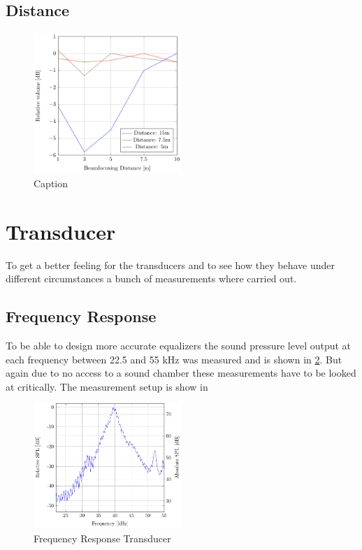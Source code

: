 \subsection{Distance}
\begin{figure}
    \centering
    \includegraphics[width=0.5\textwidth]{images/6_Measurements/Beamfocusing.pdf}
    \caption{Caption}
    \label{fig:my_label}
\end{figure}
\section{Transducer}
To get a better feeling for the transducers and to see how they behave under different circumstances a bunch of measurements where carried out. 
\subsection{Frequency Response}\label{6_sec:Frequency_response}
To be able to design more accurate equalizers the sound pressure level output at each frequency between 22.5 and 55 kHz was measured and is shown in \ref{6_Measurement_fig:Transducer_FR}. But again due to no access to a sound chamber these measurements have to be looked at critically. The measurement setup is show in 
\begin{figure}[h!]
    \centering
    \includegraphics[width=0.5\textwidth]{images/6_Measurements/Transducer_Frequency_Respone.pdf}
    \caption{Frequency Response Transducer}
    \label{6_Measurement_fig:Transducer_FR}
\end{figure}
